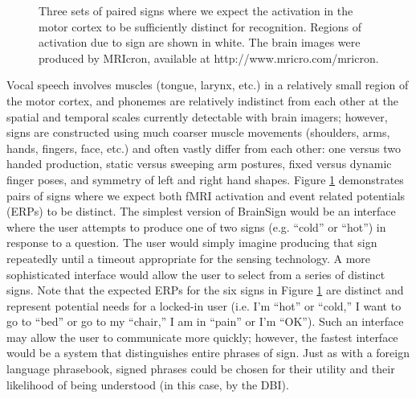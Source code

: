 \documentclass{proposal}
\begin{document}
\begin{figure}[h]
\centering
{}
\caption{Three sets of paired signs where we expect the activation in the motor cortex to be sufficiently distinct for recognition. Regions of activation due to sign are shown in white. The brain images were produced by MRIcron, available at http://www.mricro.com/mricron.}
\label{fig:brainsign}
\end{figure}

Vocal speech involves muscles (tongue, larynx, etc.) in a relatively small region of the motor cortex, and phonemes are relatively indistinct from each other at the spatial and temporal scales currently detectable with brain imagers; however, signs are constructed using much coarser muscle movements (shoulders, arms, hands, fingers, face, etc.) and often vastly differ from each other: one versus two handed production, static versus sweeping arm postures, fixed versus dynamic finger poses, and symmetry of left and right hand shapes.  Figure \ref{fig:brainsign} demonstrates pairs of signs where we expect both fMRI activation and event related potentials (ERPs) to be distinct.  The simplest version of BrainSign would be an interface where the user attempts to produce one of two signs (e.g. ``cold'' or ``hot'') in response to a question.  The user would simply imagine producing that sign repeatedly until a timeout appropriate for the sensing technology.  A more sophisticated interface would allow the user to select from a series of distinct signs.  Note that the expected ERPs for the six signs in Figure \ref{fig:brainsign} are distinct and represent potential needs for a locked-in user (i.e. I'm ``hot'' or ``cold,'' I want to go to ``bed'' or go to my ``chair,'' I am in ``pain'' or I'm ``OK'').  Such an interface may allow the user to communicate more quickly; however, the fastest interface would be a system that distinguishes entire phrases of sign. Just as with a foreign language phrasebook, signed phrases could be chosen for their utility and their likelihood of being understood (in this case, by the DBI).
\end{document}
